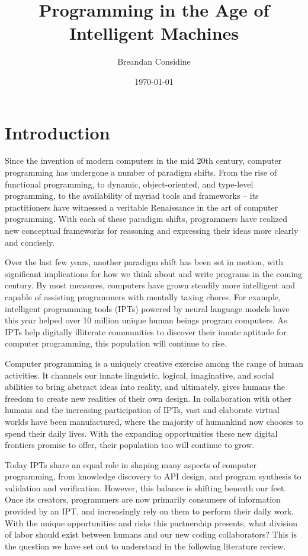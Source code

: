 \documentclass[10pt]{article}
\title{Programming in the Age of Intelligent Machines}
\author{Breandan Considine}
\date{\today}
\begin{document}
  \maketitle
  \section{Introduction}

Since the invention of modern computers in the mid 20th century, computer programming has undergone a number of paradigm shifts. From the rise of functional programming, to dynamic, object-oriented, and type-level programming, to the availability of myriad tools and frameworks -- its practitioners have witnessed a veritable Renaissance in the art of computer programming. With each of these paradigm shifts, programmers have realized new conceptual frameworks for reasoning and expressing their ideas more clearly and concisely.

Over the last few years, another paradigm shift has been set in motion, with significant implications for how we think about and write programs in the coming century. By most measures, computers have grown steadily more intelligent and capable of assisting programmers with mentally taxing chores. For example, intelligent programming tools (IPTs) powered by neural language models have this year helped over 10 million unique human beings program computers. As IPTs help digitally illiterate communities to discover their innate aptitude for computer programming, this population will continue to rise.

Computer programming is a uniquely creative exercise among the range of human activities. It channels our innate linguistic, logical, imaginative, and social abilities to bring abstract ideas into reality, and ultimately, gives humans the freedom to create new realities of their own design. In collaboration with other humans and the increasing participation of IPTs, vast and elaborate virtual worlds have been manufactured, where the majority of humankind now chooses to spend their daily lives. With the expanding opportunities these new digital frontiers promise to offer, their population too will continue to grow.

Today IPTs share an equal role in shaping many aspects of computer programming, from knowledge discovery to API design, and program synthesis to validation and verification. However, this balance is shifting beneath our feet. Once its creators, programmers are now primarily consumers of information provided by an IPT, and increasingly rely on them to perform their daily work. With the unique opportunities and risks this partnership presents, what division of labor should exist between humans and our new coding collaborators? This is the question we have set out to understand in the following literature review.
\end{document}

